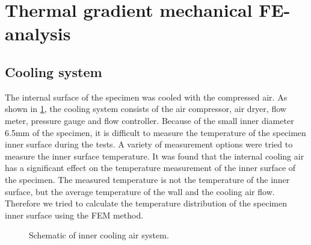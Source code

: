 \section{Thermal gradient mechanical FE-analysis}

\subsection{Cooling system}
\noindent
The internal surface of the specimen was cooled with the compressed air. As shown in \ref{Fig:inner_cooling}, the cooling system consists of the air compressor, air dryer, flow meter, pressure gauge and flow controller.
Because of the small inner diameter 6.5mm of the specimen, it is difficult to measure the temperature of the specimen inner surface during the tests.
A variety of measurement options were tried to measure the inner surface temperature.
It was found that the internal cooling air has a significant effect on the temperature measurement of the inner surface of the specimen.
The measured temperature is not the temperature of the inner surface, but the average temperature of the wall and the cooling air flow.
Therefore we tried to calculate the temperature distribution of the specimen inner surface using the FEM method.

\begin{figure}[!htp]
\caption{Schematic of inner cooling air system.}
\label{Fig:inner_cooling}
\end{figure}


